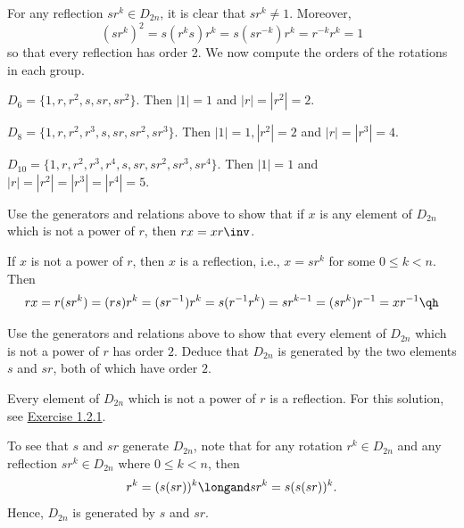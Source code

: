 \begin{sol}
    For any reflection $sr^k \in D_{2n}$, it is clear that $sr^k \neq 1$. Moreover,
    \[(sr^k)^2 = s(r^ks)r^k = s(sr^{-k})r^k = r^{-k}r^k = 1\]
    so that every reflection has order 2. We now compute the orders of the rotations in each group.
    \begin{subproblems}
        \item $D_6 = \{1, r, r^2, s, sr, sr^2\}$. Then $|1| = 1$ and $|r| = |r^2| = 2$.
        \item $D_8 = \{1, r, r^2, r^3, s, sr, sr^2, sr^3\}$. Then $|1| = 1, |r^2| = 2$ and $|r| = |r^3| = 4$.
        \item $D_{10} = \{1, r, r^2, r^3, r^4, s, sr, sr^2, sr^3, sr^4\}$. Then $|1| = 1$ and $|r| = |r^2| = |r^3| = |r^4| = 5$. \qh
    \end{subproblems}
\end{sol}

\begin{exercise}\label{ex1.2.2}
    Use the generators and relations above to show that if $x$ is any element of $D_{2n}$ which is not a power of $r$, then $rx = xr\inv$.
\end{exercise}

\begin{sol}
    If $x$ is not a power of $r$, then $x$ is a reflection, i.e., $x = sr^k$ for some $0 \leq k < n$. Then
    \[rx = r(sr^k) = (rs)r^k = (sr^{-1})r^k = s(r^{-1}r^k) = s r^{k - 1} = (sr^k) r^{-1} = x r^{-1} \qh\]
\end{sol}

\begin{exercise}\label{ex1.2.3}
    Use the generators and relations above to show that every element of $D_{2n}$ which is not a power of $r$ has order $2$. Deduce that $D_{2n}$ is generated by the two elements $s$ and $sr$, both of which have order $2$.

\end{exercise}
 
\begin{sol}
    Every element of $D_{2n}$ which is not a power of $r$ is a reflection. For this solution, see \hyperref[ex1.2.1]{Exercise 1.2.1}.

    To see that $s$ and $sr$ generate $D_{2n}$, note that for any rotation $r^k \in D_{2n}$ and any reflection $sr^k \in D_{2n}$ where $0 \leq k < n$, then
    \[r^k = (s(sr))^k \longand sr^k = s(s(sr))^k.\]
    Hence, $D_{2n}$ is generated by $s$ and $sr$.
\end{sol}

